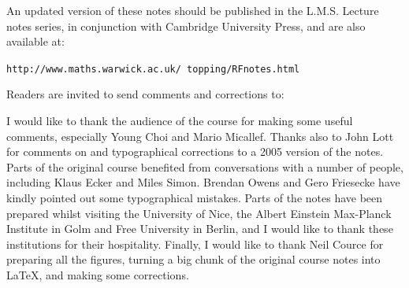 An updated version of these notes should be published in the L.M.S. Lecture
notes series, in conjunction with Cambridge University Press, and are also
available at:

\begin{center}
\texttt{http://www.maths.warwick.ac.uk/\string~topping/RFnotes.html}
\end{center}

Readers are invited to send comments and corrections to:

I would like to thank the audience of the course for making some useful
comments, especially Young Choi and Mario Micallef. Thanks also to John
Lott for comments on and typographical corrections to a 2005 version of
the notes. Parts of the original course benefited from conversations with a
number of people, including Klaus Ecker and Miles Simon. Brendan Owens
and Gero Friesecke have kindly pointed out some typographical mistakes.
Parts of the notes have been prepared whilst visiting the University of Nice,
the Albert Einstein Max-Planck Institute in Golm and Free University in
Berlin, and I would like to thank these institutions for their hospitality.
Finally, I would like to thank Neil Cource for preparing all the figures,
turning a big chunk of the original course notes into \LaTeX, and making
some corrections.
